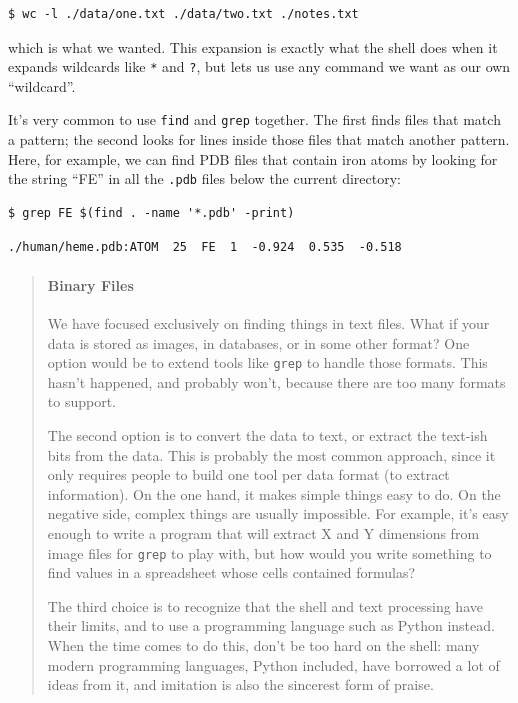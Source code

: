 \documentclass[]{book}
\begin{document}
\begin{verbatim}
$ wc -l ./data/one.txt ./data/two.txt ./notes.txt
\end{verbatim}

which is what we wanted. This expansion is exactly what the shell does
when it expands wildcards like \texttt{*} and \texttt{?}, but lets us
use any command we want as our own ``wildcard''.

It's very common to use \texttt{find} and \texttt{grep} together. The
first finds files that match a pattern; the second looks for lines
inside those files that match another pattern. Here, for example, we can
find PDB files that contain iron atoms by looking for the string ``FE''
in all the \texttt{.pdb} files below the current directory:

\begin{verbatim}
$ grep FE $(find . -name '*.pdb' -print)
\end{verbatim}

\begin{verbatim}
./human/heme.pdb:ATOM  25  FE  1  -0.924  0.535  -0.518
\end{verbatim}

\begin{quote}
\mbox{}\paragraph{Binary Files}

We have focused exclusively on finding things in text files. What if
your data is stored as images, in databases, or in some other format?
One option would be to extend tools like \texttt{grep} to handle those
formats. This hasn't happened, and probably won't, because there are too
many formats to support.

The second option is to convert the data to text, or extract the
text-ish bits from the data. This is probably the most common approach,
since it only requires people to build one tool per data format (to
extract information). On the one hand, it makes simple things easy to
do. On the negative side, complex things are usually impossible. For
example, it's easy enough to write a program that will extract X and Y
dimensions from image files for \texttt{grep} to play with, but how
would you write something to find values in a spreadsheet whose cells
contained formulas?

The third choice is to recognize that the shell and text processing have
their limits, and to use a programming language such as Python instead.
When the time comes to do this, don't be too hard on the shell: many
modern programming languages, Python included, have borrowed a lot of
ideas from it, and imitation is also the sincerest form of praise.
\end{quote}
\end{document}
